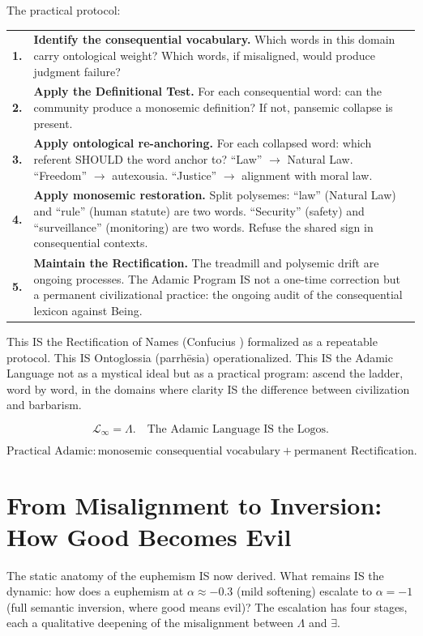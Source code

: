 \documentclass[11pt, oneside]{article}
\theoremstyle{definition}
\begin{document}
The practical protocol:

{\small
\noindent\begin{tabular}{r p{}}
\textbf{1.} & \textbf{Identify the consequential vocabulary.} Which words in this domain carry ontological weight? Which words, if misaligned, would produce judgment failure? \\[0.3em]
\textbf{2.} & \textbf{Apply the Definitional Test.} For each consequential word: can the community produce a monosemic definition? If not, pansemic collapse is present. \\[0.3em]
\textbf{3.} & \textbf{Apply ontological re-anchoring.} For each collapsed word: which referent SHOULD the word anchor to? ``Law'' $\to$ Natural Law. ``Freedom'' $\to$ autexousia. ``Justice'' $\to$ alignment with moral law. \\[0.3em]
\textbf{4.} & \textbf{Apply monosemic restoration.} Split polysemes: ``law'' (Natural Law) and ``rule'' (human statute) are two words. ``Security'' (safety) and ``surveillance'' (monitoring) are two words. Refuse the shared sign in consequential contexts. \\[0.3em]
\textbf{5.} & \textbf{Maintain the Rectification.} The treadmill and polysemic drift are ongoing processes. The Adamic Program IS not a one-time correction but a permanent civilizational practice: the ongoing audit of the consequential lexicon against Being. \\[0.3em]
\end{tabular}
}

This IS the Rectification of Names (Confucius \cite{confucius}) formalized as a repeatable protocol. This IS Ontoglossia (parrh\={e}sia) operationalized. This IS the Adamic Language not as a mystical ideal but as a practical program: ascend the ladder, word by word, in the domains where clarity IS the difference between civilization and barbarism.

$$\boxed{\mathcal{L}_\infty = \Lambda. \quad \text{The Adamic Language IS the Logos.}}$$

$$\boxed{\text{Practical Adamic}: \text{monosemic consequential vocabulary} + \text{permanent Rectification}.}$$

\section{From Misalignment to Inversion: How Good Becomes Evil}

The static anatomy of the euphemism IS now derived. What remains IS the dynamic: how does a euphemism at $\alpha \approx -0.3$ (mild softening) escalate to $\alpha = -1$ (full semantic inversion, where good means evil)? The escalation has four stages, each a qualitative deepening of the misalignment between $\Lambda$ and $\exists$.
\end{document}
